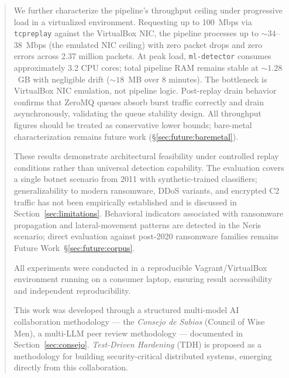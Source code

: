 \documentclass[11pt,a4paper]{article}
\begin{document}
\begin{abstract}
        We further characterize the pipeline's throughput ceiling under progressive load in a
        virtualized environment. Requesting up to 100~Mbps via \texttt{tcpreplay} against the
        VirtualBox NIC, the pipeline processes up to ${\sim}34$--38~Mbps (the emulated NIC ceiling)
        with zero packet drops and zero errors across 2.37 million packets. At peak load,
        \texttt{ml-detector} consumes approximately 3.2 CPU cores; total pipeline RAM remains stable
        at ${\sim}1.28$~GB with negligible drift (${\sim}18$~MB over 8 minutes). The bottleneck is
        VirtualBox NIC emulation, not pipeline logic. Post-replay drain behavior confirms that
        ZeroMQ queues absorb burst traffic correctly and drain asynchronously, validating the queue
        stability design. All throughput figures should be treated as conservative lower bounds;
        bare-metal characterization remains future work (\S\ref{sec:future:baremetal}).

        These results demonstrate architectural feasibility under controlled replay conditions rather
        than universal detection capability. The evaluation covers a single botnet scenario from 2011
        with synthetic-trained classifiers; generalizability to modern ransomware, DDoS variants, and
        encrypted C2 traffic has not been empirically established and is discussed in
        Section~\ref{sec:limitations}. Behavioral indicators associated with ransomware propagation
        and lateral-movement patterns are detected in the Neris scenario; direct evaluation against
        post-2020 ransomware families remains Future Work~\S\ref{sec:future:corpus}.

        All experiments were conducted in a reproducible Vagrant/VirtualBox environment running on a
        consumer laptop, ensuring result accessibility and independent reproducibility.

        This work was developed through a structured multi-model AI collaboration methodology ---
        the \emph{Consejo de Sabios} (Council of Wise Men), a multi-LLM peer review methodology ---
        documented in Section~\ref{sec:consejo}. \emph{Test-Driven Hardening} (TDH) is proposed
        as a methodology for building security-critical distributed systems, emerging directly from
        this collaboration.


\end{abstract}
\end{document}
